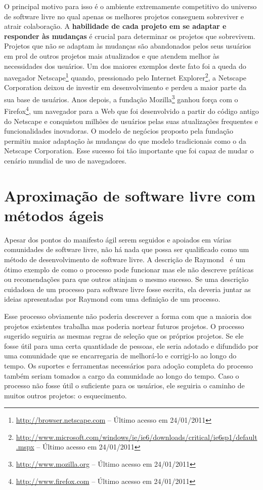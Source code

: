 O principal motivo para isso é o ambiente extremamente competitivo do
universo de software livre no qual apenas os melhores projetos
conseguem sobreviver e atrair colaboração. A \textbf{habilidade de
  cada projeto em se adaptar e responder às mudanças} é crucial para
determinar os projetos que sobrevivem.  Projetos que não se adaptam às
mudanças são abandonados pelos seus usuários em prol de outros
projetos mais atualizados e que atendem melhor às necessidades dos
usuários.  Um dos maiores exemplos deste fato foi a queda do navegador
Netscape\footnote{\url{http://browser.netscape.com} -- Último acesso
  em 24/01/2011} quando, pressionado pelo Internet
Explorer\footnote{\url{http://www.microsoft.com/windows/ie/ie6/downloads/critical/ie6sp1/default.mspx}
  -- Último acesso em 24/01/2011}, a Netscape Corporation deixou de
investir em desenvolvimento e perdeu a maior parte da sua base de
usuários. Anos depois, a fundação
Mozilla\footnote{\url{http://www.mozilla.org} -- Último acesso em
  24/01/2011} ganhou força com o
Firefox\footnote{\url{http://www.firefox.com} -- Último acesso em
  24/01/2011}, um navegador para a Web que foi desenvolvido a partir
do código antigo do Netscape e conquistou milhões de usuários pelas
suas atualizações frequentes e funcionalidades inovadoras. O modelo de
negócios proposto pela fundação permitiu maior adaptação às mudanças
do que modelo tradicionais como o da Netscape Corporation. Esse
sucesso foi tão importante que foi capaz de mudar o cenário mundial de
uso de navegadores.

\section{Aproximação de software livre com métodos ágeis}
\label{sec:agile?}

Apesar dos pontos do manifesto ágil serem seguidos e apoiados em
várias comunidades de software livre, não há nada que possa ser
qualificado como um método de desenvolvimento de software livre. A
descrição de Raymond~\cite{Raymond1999} é um ótimo exemplo de como o
processo pode funcionar mas ele não descreve práticas ou recomendações
para que outros atinjam o mesmo sucesso. Se uma descrição cuidadosa de
um processo para software livre fosse escrita, ela deveria juntar as
ideias apresentadas por Raymond com uma definição de um processo.


Esse processo obviamente não poderia descrever a forma com que a
maioria dos projetos existentes trabalha mas poderia nortear futuros
projetos. O processo sugerido seguiria as mesmas regras de seleção que
os próprios projetos. Se ele fosse útil para uma certa quantidade de
pessoas, ele seria adotado e difundido por uma comunidade que se
encarregaria de melhorá-lo e corrigi-lo ao longo do tempo. Os suportes
e ferramentas necessários para adoção completa do processo também
seriam tomados a cargo da comunidade ao longo do tempo. Caso o
processo não fosse útil o suficiente para os usuários, ele seguiria o
caminho de muitos outros projetos: o esquecimento.

